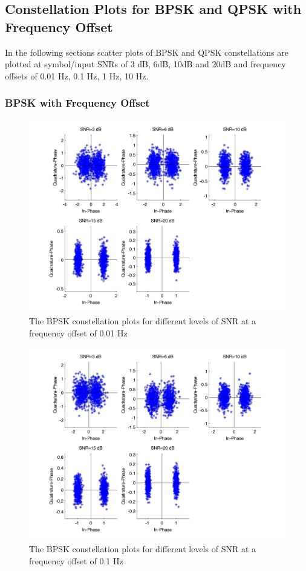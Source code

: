 \documentclass[]{article}
\begin{document}
\subsection{Constellation Plots for BPSK and QPSK with Frequency Offset}
In the following sections scatter plots of  BPSK and QPSK constellations are plotted at symbol/input SNRs of 3 dB, 6dB, 10dB and 20dB and frequency offsets of 0.01 Hz, 0.1 Hz, 1 Hz, 10 Hz.

\subsubsection{BPSK with Frequency Offset}
\label{sec:bpsk_freqConst}
\begin{figure}[H]
\centering
\hspace*{-2cm}\includegraphics[width=1.3\textwidth]{bpConstfo1.jpg}
\caption{The BPSK constellation plots for different levels of SNR at a frequency offset of 0.01 Hz}
\end{figure}

\begin{figure}[H]
\centering
\hspace*{-2cm}\includegraphics[width=1.3\textwidth]{bpConstfo2.jpg}
\caption{The BPSK constellation plots for different levels of SNR at a frequency offset of 0.1 Hz}
\end{figure}
\end{document}
